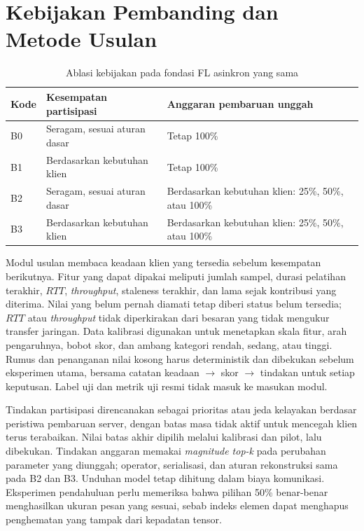 \section{Kebijakan Pembanding dan Metode Usulan}
\begin{table}[ht]
\centering
\caption{Ablasi kebijakan pada fondasi FL asinkron yang sama}
\label{tab:kebijakan}
\begin{tabular}{>{\raggedright\arraybackslash}p{1.1cm}>{\raggedright\arraybackslash}p{5.7cm}>{\raggedright\arraybackslash}p{5.7cm}}
\toprule
Kode & Kesempatan partisipasi & Anggaran pembaruan unggah \\
\midrule
B0 & Seragam, sesuai aturan dasar & Tetap 100\% \\
B1 & Berdasarkan kebutuhan klien & Tetap 100\% \\
B2 & Seragam, sesuai aturan dasar & Berdasarkan kebutuhan klien: 25\%, 50\%, atau 100\% \\
B3 & Berdasarkan kebutuhan klien & Berdasarkan kebutuhan klien: 25\%, 50\%, atau 100\% \\
\bottomrule
\end{tabular}
\end{table}

Modul usulan membaca keadaan klien yang tersedia sebelum kesempatan berikutnya. Fitur yang dapat dipakai meliputi jumlah sampel, durasi pelatihan terakhir, $RTT$, \textit{throughput}, staleness terakhir, dan lama sejak kontribusi yang diterima. Nilai yang belum pernah diamati tetap diberi status belum tersedia; $RTT$ atau \textit{throughput} tidak diperkirakan dari besaran yang tidak mengukur transfer jaringan. Data kalibrasi digunakan untuk menetapkan skala fitur, arah pengaruhnya, bobot skor, dan ambang kategori rendah, sedang, atau tinggi. Rumus dan penanganan nilai kosong harus deterministik dan dibekukan sebelum eksperimen utama, bersama catatan keadaan $\rightarrow$ skor $\rightarrow$ tindakan untuk setiap keputusan. Label uji dan metrik uji resmi tidak masuk ke masukan modul.

Tindakan partisipasi direncanakan sebagai prioritas atau jeda kelayakan berdasar peristiwa pembaruan server, dengan batas masa tidak aktif untuk mencegah klien terus terabaikan. Nilai batas akhir dipilih melalui kalibrasi dan pilot, lalu dibekukan. Tindakan anggaran memakai \textit{magnitude top-k} pada perubahan parameter yang diunggah; operator, serialisasi, dan aturan rekonstruksi sama pada B2 dan B3. Unduhan model tetap dihitung dalam biaya komunikasi. Eksperimen pendahuluan perlu memeriksa bahwa pilihan 50\% benar-benar menghasilkan ukuran pesan yang sesuai, sebab indeks elemen dapat menghapus penghematan yang tampak dari kepadatan tensor.


